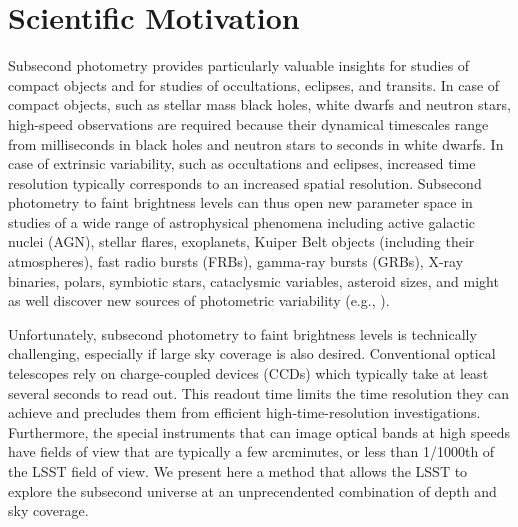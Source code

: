 \documentclass[12pt, letterpaper]{article}
\begin{document}
\clearpage

\section{Scientific Motivation}


Subsecond photometry provides particularly valuable insights for studies of compact 
objects and for studies of occultations, eclipses, and transits. In case of compact objects, 
such as stellar mass black holes, white dwarfs and neutron stars, high-speed observations
are required because their dynamical timescales range from milliseconds in black holes and 
neutron stars to seconds in white dwarfs. In case of extrinsic variability, such as occultations 
and eclipses, increased time resolution typically corresponds to an increased spatial resolution. 
Subsecond photometry to faint brightness levels can thus open new parameter space in studies 
of a wide range of astrophysical phenomena including active galactic nuclei (AGN), stellar flares, 
exoplanets, Kuiper Belt objects (including their atmospheres), fast radio bursts (FRBs), gamma-ray 
bursts (GRBs), X-ray binaries, polars, symbiotic stars, cataclysmic variables, asteroid sizes, and
might as well discover new sources of photometric variability (e.g., \citealt{D2011, KRS2014, 
Gandhi2016}). 

Unfortunately, subsecond photometry to faint brightness levels is technically challenging, especially
if large sky coverage is also desired. Conventional optical telescopes rely on charge-coupled devices 
(CCDs) which typically take at least several seconds to read out. This readout time limits the time 
resolution they can achieve and precludes them from efficient high-time-resolution investigations. 
Furthermore, the special instruments that can image optical bands at high speeds have fields of view 
that are typically a few arcminutes, or less than 1/1000th of the LSST field of view. We present here 
a method that allows the LSST to explore the subsecond universe at an unprecendented combination of 
depth and sky coverage. 
\end{document}
